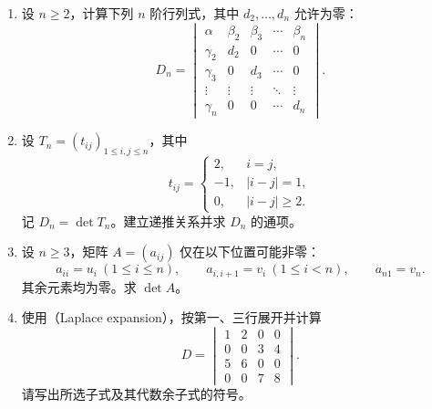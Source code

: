 \documentclass[UTF8,12pt,a4paper,fontset=fandol]{ctexart}
\begin{document}
\begin{enumerate}[label=\arabic*.,resume=detquestions]
\item\label{q:arrow}
设 $n\geq2$，计算下列 $n$ 阶行列式，其中 $d_2,\ldots,d_n$ 允许为零：
\[
D_n=\begin{vmatrix}
\alpha&\beta_2&\beta_3&\cdots&\beta_n\\
\gamma_2&d_2&0&\cdots&0\\
\gamma_3&0&d_3&\cdots&0\\
\vdots&\vdots&\vdots&\ddots&\vdots\\
\gamma_n&0&0&\cdots&d_n
\end{vmatrix}.
\]

\item\label{q:tridiagonal}
设 $T_n=(t_{ij})_{1\leq i,j\leq n}$，其中
\[
t_{ij}=\begin{cases}2,&i=j,\\-1,&|i-j|=1,\\0,&|i-j|\geq2.\end{cases}
\]
记 $D_n=\det T_n$。建立递推关系并求 $D_n$ 的通项。

\item\label{q:cyclic}
设 $n\geq3$，矩阵 $A=(a_{ij})$ 仅在以下位置可能非零：
\[
a_{ii}=u_i\ (1\leq i\leq n),\qquad
a_{i,i+1}=v_i\ (1\leq i<n),\qquad a_{n1}=v_n.
\]
其余元素均为零。求 $\det A$。

\item\label{q:laplace}
使用（Laplace expansion），按第一、三行展开并计算
\[
D=\begin{vmatrix}
1&2&0&0\\0&0&3&4\\5&6&0&0\\0&0&7&8
\end{vmatrix}.
\]
请写出所选子式及其代数余子式的符号。
\end{enumerate}
\end{document}
